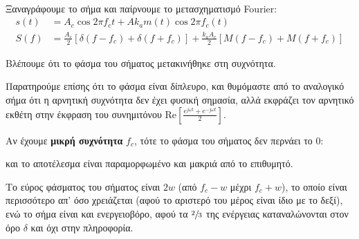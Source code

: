 \documentclass[11pt,a4paper,notitlepage,fleqn]{article}
\begin{document}
\paragraph{}
Ξαναγράφουμε το σήμα και παίρνουμε το μετασχηματισμό Fourier:
\begin{align*}
	s(t) &= A_c \cos 2\pi f_c t + Ak_a m(t) \cos 2\pi f_c (t) \\
	S(f) &=
	\frac{A_c}{2}\left[ δ(f-f_c)+δ(f+f_c) \right]
	+ \frac{k_aA_c}{2}\left[ M(f-f_c) + M(f+f_c) \right]
\end{align*}

Βλέπουμε ότι το φάσμα του σήματος μετακινήθηκε στη συχνότητα.

Παρατηρούμε επίσης ότι το φάσμα είναι δίπλευρο, και θυμόμαστε από το αναλογικό σήμα ότι
η αρνητική συχνότητα δεν έχει φυσική σημασία, αλλά εκφράζει τον αρνητικό εκθέτη στην
έκφραση του συνημιτόνου \( 
\mathrm{Re}\left[
\frac{e^{jωt}+e^{-jωt}}{2}
\right]
 \).
 
Αν έχουμε \textbf{μικρή συχνότητα} \( f_c \), τότε το φάσμα του σήματος δεν περνάει το 0:


και το αποτέλεσμα είναι παραμορφωμένο και μακριά από το επιθυμητό.

Το εύρος φάσματος του σήματος είναι \( 2w \) (από \( f_c-w \) μέχρι \( f_c+w \)), το οποίο
είναι περισσότερο απ' όσο χρειάζεται (αφού το αριστερό του μέρος είναι ίδιο με το δεξί),
ενώ το σήμα είναι και ενεργειοβόρο, αφού τα \( \sfrac{2}{3}  \) της ενέργειας καταναλώνονται
στον όρο \( δ \) και όχι στην πληροφορία.
\end{document}
